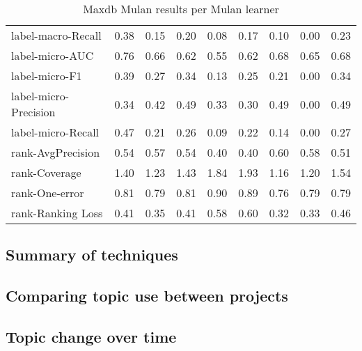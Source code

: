 \documentclass{acm_proc_article-sp}
\begin{document}
\begin{table*}
\begin{tabular}{l|rrrrrrrr}
label-macro-Recall & 0.38 & 0.15 & 0.20 & 0.08 & 0.17 & 0.10 & 0.00 & 0.23 \\

label-micro-AUC & 0.76 & 0.66 & 0.62 & 0.55 & 0.62 & 0.68 & 0.65 & 0.68 \\

label-micro-F1 & 0.39 & 0.27 & 0.34 & 0.13 & 0.25 & 0.21 & 0.00 & 0.34 \\

label-micro-Precision & 0.34 & 0.42 & 0.49 & 0.33 & 0.30 & 0.49 & 0.00 & 0.49 \\

label-micro-Recall & 0.47 & 0.21 & 0.26 & 0.09 & 0.22 & 0.14 & 0.00 & 0.27 \\

rank-AvgPrecision & 0.54 & 0.57 & 0.54 & 0.40 & 0.40 & 0.60 & 0.58 & 0.51 \\

rank-Coverage & 1.40 & 1.23 & 1.43 & 1.84 & 1.93 & 1.16 & 1.20 & 1.54 \\

rank-One-error & 0.81 & 0.79 & 0.81 & 0.90 & 0.89 & 0.76 & 0.79 & 0.79 \\

rank-Ranking Loss & 0.41 & 0.35 & 0.41 & 0.58 & 0.60 & 0.32 & 0.33 & 0.46 \\

\end{tabular}

\caption{Maxdb Mulan results per Mulan learner}

\end{table*}

\subsection{Summary of techniques}


\subsection{Comparing topic use between projects}


\subsection{Topic change over time}
\end{document}
